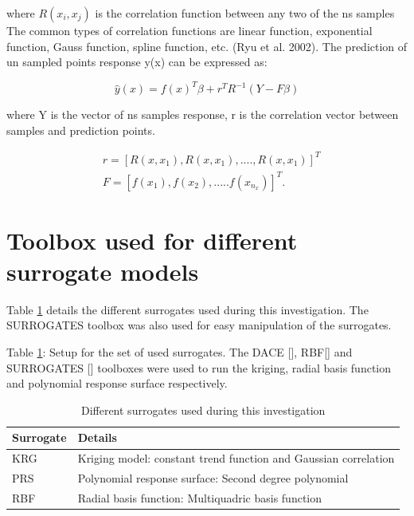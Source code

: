 where $ R (x_{i},x_{j}) $  is the correlation function between any two of the ns samples The common types of correlation functions are linear function, exponential function, Gauss function, spline function, etc. (Ryu et al. 2002). The prediction of un sampled points response y(x) can be expressed as:

\begin{equation}
\hat{y}(x) = f(x)^{T} \beta + r^{T} R^{-1} (Y - F \beta )
\end{equation}

where Y is the vector of ns samples response, r is the correlation vector between samples and prediction points.


\begin{eqnarray}
& r = [R(x,x_{1}),R(x,x_{1}),....,R(x,x_{1}) ]^{T} \\
& F = [f(x_{1}), f(x_{2}),.....f(x_{n_{x}}) ]^{T} .
\end{eqnarray}

\section{Toolbox used for different surrogate models}

Table \ref{Different surrogates used during this investigation} details the different surrogates used during this investigation. The SURROGATES toolbox was also used for easy manipulation of the surrogates.

Table \ref{Different surrogates used during this investigation}: Setup for the set of used surrogates. The  DACE [], RBF[] and SURROGATES [] toolboxes were used to run the kriging, radial basis function and polynomial response surface respectively.

\begin{table}[H]
	\centering
	\caption{Different surrogates used during this investigation}
	\label{Different surrogates used during this investigation}
	\begin{tabular}{ll}
		\hline \hline
		Surrogate & Details    \\ \hline \hline
		KRG	 & Kriging model: constant trend function and Gaussian correlation \\
		PRS & Polynomial response surface: Second degree polynomial \\
		RBF  & Radial basis function: Multiquadric basis function \\
		\hline \hline
	\end{tabular}
\end{table}


